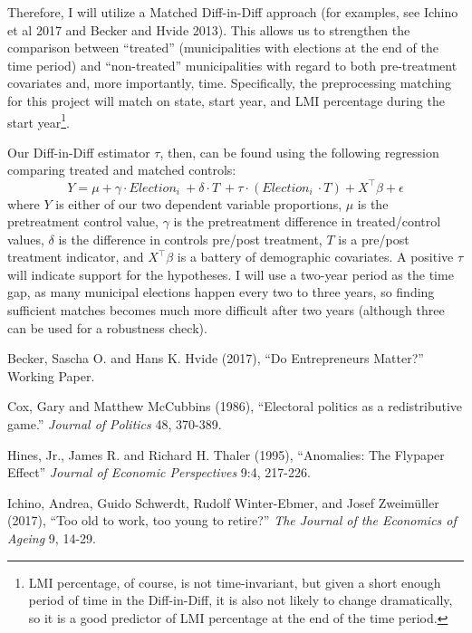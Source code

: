 \documentclass[12pt,a4paper]{article}
\begin{document}
\par Therefore, I will utilize a Matched Diff-in-Diff approach (for examples, see Ichino et al 2017 and Becker and Hvide 2013). This allows us to strengthen the comparison between ``treated'' (municipalities with elections at the end of the time period) and ``non-treated'' municipalities with regard to both pre-treatment covariates and, more importantly, time. Specifically, the preprocessing matching for this project will match on state, start year, and LMI percentage during the start year\footnote{LMI percentage, of course, is not time-invariant, but given a short enough period of time in the Diff-in-Diff, it is also not likely to change dramatically, so it is a good predictor of LMI percentage at the end of the time period.}.

\par Our Diff-in-Diff estimator $\tau$, then, can be found using the following regression comparing treated and matched controls:
$$ 
Y = \mu + \gamma \cdot Election_i\ + \delta \cdot T\ + \tau \cdot (Election_i\ \cdot T) + X^\top \beta + \epsilon
$$
where $Y$ is either of our two dependent variable proportions, $\mu$ is the pretreatment control value, $\gamma$ is the pretreatment difference in treated/control values, $\delta$ is the difference in controls pre/post treatment, $T$ is a pre/post treatment indicator, and $X^\top \beta$ is a battery of demographic covariates. A positive $\tau$ will indicate support for the hypotheses. I will use a two-year period as the time gap, as many municipal elections happen every two to three years, so finding sufficient matches becomes much more difficult after two years (although three can be used for a robustness check).

\newpage

\begin{thebibliography}{9}
Becker, Sascha O. and Hans K. Hvide (2017), ``Do Entrepreneurs Matter?'' Working Paper.

Cox, Gary and Matthew McCubbins (1986), ``Electoral politics as a redistributive game.'' \textit{Journal of Politics} 48, 370-389.

Hines, Jr., James R. and Richard H. Thaler (1995), ``Anomalies: The Flypaper Effect'' \textit{Journal of Economic Perspectives} 9:4, 217-226.

Ichino, Andrea, Guido Schwerdt, Rudolf Winter-Ebmer, and Josef Zweim{\"u}ller (2017), ``Too old to work, too young to retire?'' \textit{The Journal of the Economics of Ageing} 9, 14-29.
\end{thebibliography}
\end{document}
